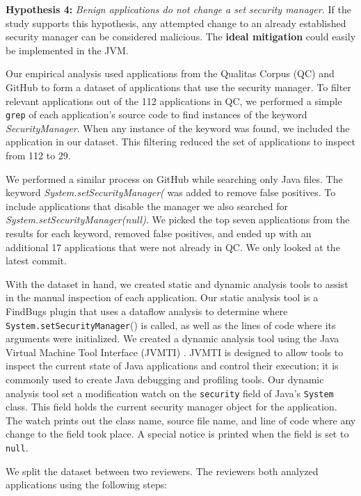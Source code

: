 \documentclass{sig-alternate}
\begin{document}
\textbf{Hypothesis 4:} \textit{Benign applications do not change a
set security manager.} If the study supports this hypothesis, any
attempted change to an already established security manager can be
considered malicious. The \textbf{ideal mitigation} could easily be
implemented in the JVM. 

Our empirical analysis used applications from the Qualitas Corpus
(QC) \cite{QualitasCorpus:APSEC:2010} and GitHub to form a dataset
of applications that use the security manager. To filter relevant
applications out of the 112 applications in QC, we performed a simple
\texttt{grep} of each application's source code to find instances
of the keyword \textit{SecurityManager}. When any instance of the
keyword was found, we included the application in our dataset. This
filtering reduced the set of applications to inspect from 112 to 29. 

We performed a similar process on GitHub while searching only Java files. The keyword \textit{System.setSecurityManager(} was added to remove false positives. To include applications that disable the manager we also searched for \textit{System.setSecurityManager(null)}. We picked the top seven applications from the results for each keyword, removed false positives, and ended up with an additional 17 applications that were not already in QC. We only looked at the latest commit.

With the dataset in hand, we created static and dynamic analysis tools
to assist in the manual inspection of each application. Our static
analysis tool is a FindBugs \cite{hovemeyer_finding_2004} plugin
that uses a dataflow analysis to determine where \texttt{System.setSecurityManager}()
is called, as well as the lines of code where its arguments were initialized.
We created a dynamic analysis tool using the Java Virtual Machine
Tool Interface (JVMTI) \cite{_jvmti}. JVMTI is designed to allow
tools to inspect the current state of Java applications and control
their execution; it is commonly used to create Java debugging and
profiling tools. Our dynamic analysis tool set a modification watch
on the \texttt{security} field of Java's \texttt{System} class. This
field holds the current security manager object for the application.
The watch prints out the class name, source file name, and line of
code where any change to the field took place. A special notice is
printed when the field is set to \texttt{null}. 

We split the dataset between two reviewers. The reviewers both analyzed
applications using the following steps:
\end{document}
